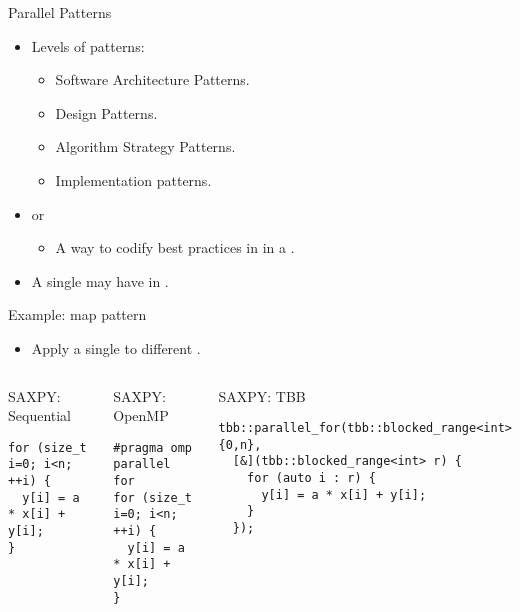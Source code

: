 \begin{frame}[t]{Parallel Patterns}
\begin{itemize}
  \item Levels of patterns:
    \begin{itemize}
      \item Software Architecture Patterns.
      \item Design Patterns.
      \item Algorithm Strategy Patterns.
      \item Implementation patterns.
    \end{itemize}

  \vfill\pause
  \item {} or 
    \begin{itemize}
      \item A way to codify best practices in  
            in a .
    \end{itemize}

  \vfill\pause
  \item A single  may have 
        in .
  
\end{itemize}
\end{frame}

\begin{frame}[t,fragile]{Example: map pattern}
\begin{itemize}
  \item Apply a single  to different .
\end{itemize}
\begin{columns}

\begin{block}{SAXPY: Sequential}
\begin{lstlisting}
for (size_t i=0; i<n; ++i) {
  y[i] = a * x[i] + y[i];
}
\end{lstlisting}
\end{block}

\pause

\begin{block}{SAXPY: OpenMP}
\begin{lstlisting}[morekeywords={[1]{omp,parallel}}]
#pragma omp parallel for
for (size_t i=0; i<n; ++i) {
  y[i] = a * x[i] + y[i];
}
\end{lstlisting}
\end{block}

\pause

\begin{block}{SAXPY: TBB}
\begin{lstlisting}
tbb::parallel_for(tbb::blocked_range<int>{0,n},
  [&](tbb::blocked_range<int> r) {
    for (auto i : r) {
      y[i] = a * x[i] + y[i];
    }
  });
\end{lstlisting}
\end{block}
\end{columns}
\end{frame}
